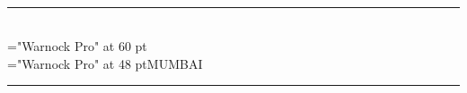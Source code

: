 \documentclass[a4paper,11pt,landscape]{article}
\begin{document}
\pagestyle{empty}
\begin{center}
\mbox{}\\[2.5in]
\hrule\mbox{}
\mbox{}\\[1ex]
\mbox{}
{\font\x="Warnock Pro" at 60 pt\\[0.5cm]}
\mbox{}
{\font\x="Warnock Pro" at 48 pt\x \uppercase{Mumbai}\\[0.3cm]}
\hrule

\end{center}
\end{document}
